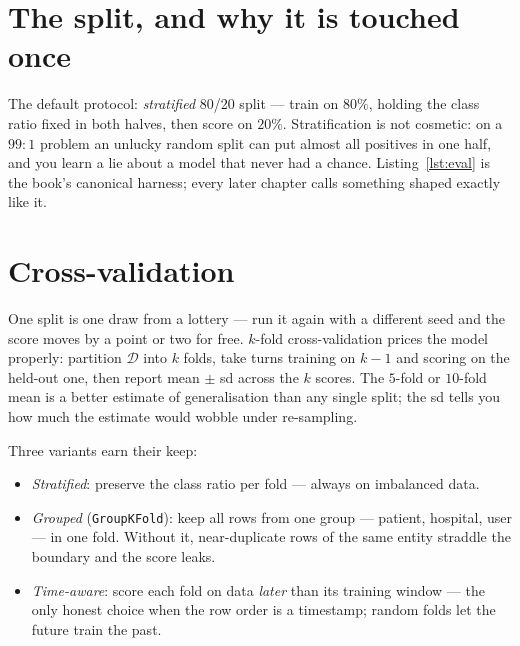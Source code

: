 \section{The split, and why it is touched once}\label{sec:split}

The default protocol: \emph{stratified} 80/20 split --- train on $80\%$,
holding the class ratio fixed in both halves, then score on $20\%$.
Stratification is not cosmetic: on a $99{:}1$ problem an unlucky random
split can put almost all positives in one half, and you learn a lie about a
model that never had a chance. Listing~\ref{lst:eval} is the book's
canonical harness; every later chapter calls something shaped exactly like
it.





\section{Cross-validation}\label{sec:cv}

One split is one draw from a lottery --- run it again with a different seed
and the score moves by a point or two for free. $k$-fold
cross-validation prices the model properly:
partition $\mathcal D$ into $k$ folds, take turns training on $k{-}1$ and
scoring on the held-out one, then report mean $\pm$ sd across the $k$
scores. The $5$-fold or $10$-fold mean is a better estimate of generalisation
than any single split; the sd tells you how much the estimate would wobble
under re-sampling.

Three variants earn their keep:

\begin{itemize}
\item \emph{Stratified}: preserve the class ratio per fold --- always on
  imbalanced data.
\item \emph{Grouped} (\texttt{GroupKFold}): keep all rows from one
  group --- patient, hospital, user --- in one fold. Without it, near-duplicate
  rows of the same entity straddle the boundary and the score leaks.
\item \emph{Time-aware}: score each fold on data \emph{later} than its
  training window --- the only honest choice when the row order is a
  timestamp; random folds let the future train the past.
\end{itemize}

